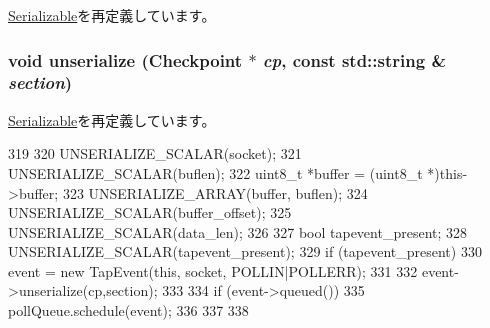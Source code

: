 \hyperlink{classSerializable_ad6272f80ae37e8331e3969b3f072a801}{Serializable}を再定義しています。\hypertarget{classEtherTap_af22e5d6d660b97db37003ac61ac4ee49}{
\subsubsection[{unserialize}]{\setlength{\rightskip}{0pt plus 5cm}void unserialize ({\bf Checkpoint} $\ast$ {\em cp}, \/  const std::string \& {\em section})}}
\label{classEtherTap_af22e5d6d660b97db37003ac61ac4ee49}


\hyperlink{classSerializable_af100c4e9feabf3cd918619c88c718387}{Serializable}を再定義しています。


\begin{DoxyCode}
319 {
320     UNSERIALIZE_SCALAR(socket);
321     UNSERIALIZE_SCALAR(buflen);
322     uint8_t *buffer = (uint8_t *)this->buffer;
323     UNSERIALIZE_ARRAY(buffer, buflen);
324     UNSERIALIZE_SCALAR(buffer_offset);
325     UNSERIALIZE_SCALAR(data_len);
326 
327     bool tapevent_present;
328     UNSERIALIZE_SCALAR(tapevent_present);
329     if (tapevent_present) {
330         event = new TapEvent(this, socket, POLLIN|POLLERR);
331 
332         event->unserialize(cp,section);
333 
334         if (event->queued()) {
335             pollQueue.schedule(event);
336         }
337     }
338 }
\end{DoxyCode}


